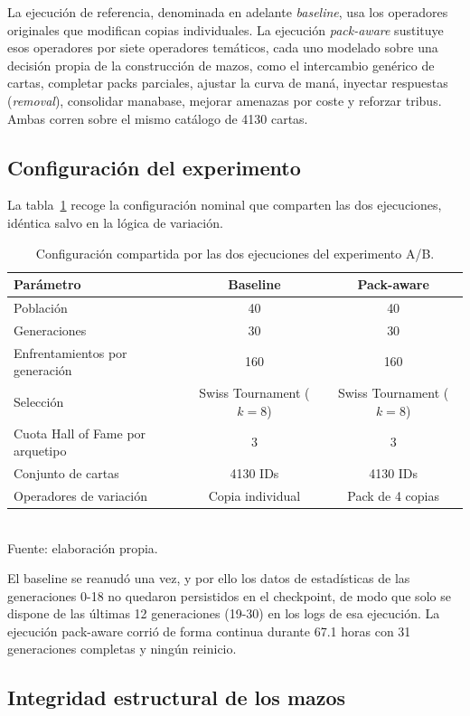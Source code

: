 La ejecución de referencia, denominada en adelante \emph{baseline}, usa los operadores originales que modifican copias individuales. La ejecución \emph{pack-aware} sustituye esos operadores por siete operadores temáticos, cada uno modelado sobre una decisión propia de la construcción de mazos, como el intercambio genérico de cartas, completar packs parciales, ajustar la curva de maná, inyectar respuestas (\emph{removal}), consolidar manabase, mejorar amenazas por coste y reforzar tribus. Ambas corren sobre el mismo catálogo de 4130 cartas.

\subsection{Configuración del experimento}

La tabla~\ref{tab:config-ab} recoge la configuración nominal que comparten las dos ejecuciones, idéntica salvo en la lógica de variación.

\begin{table}[H]
\centering
\caption{Configuración compartida por las dos ejecuciones del experimento A/B.}
\label{tab:config-ab}
\begin{tabular}{lcc}
\toprule
\textbf{Parámetro} & \textbf{Baseline} & \textbf{Pack-aware} \\
\midrule
Población & 40 & 40 \\
Generaciones & 30 & 30 \\
Enfrentamientos por generación & 160 & 160 \\
Selección & Swiss Tournament ($k=8$) & Swiss Tournament ($k=8$) \\
Cuota Hall of Fame por arquetipo & 3 & 3 \\
Conjunto de cartas & 4130 IDs & 4130 IDs \\
Operadores de variación & Copia individual & Pack de 4 copias \\
\bottomrule
\end{tabular}
\\[2pt]{\footnotesize Fuente: elaboración propia.}
\end{table}

El baseline se reanudó una vez, y por ello los datos de estadísticas de las generaciones 0-18 no quedaron persistidos en el checkpoint, de modo que solo se dispone de las últimas 12 generaciones (19-30) en los logs de esa ejecución. La ejecución pack-aware corrió de forma continua durante 67.1 horas con 31 generaciones completas y ningún reinicio.

\subsection{Integridad estructural de los mazos}

